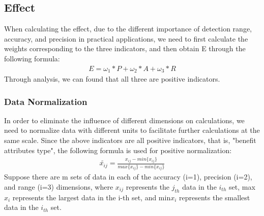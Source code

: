 \documentclass[12pt]{article}  %
\begin{document}
\subsection{Effect}
When calculating the effect, due to the different importance of detection range, accuracy, and precision in practical applications, we need to first calculate the weights corresponding to the three indicators, and then obtain E through the following formula:
\begin{equation}
    \begin{aligned}
E=\omega_1*P+\omega_2*A+\omega_3*R
 \end{aligned}
      \end{equation}
Through analysis, we can found that all three are positive indicators.
\subsubsection{Data Normalization}
\indent In order to eliminate the influence of different dimensions on calculations, we need to normalize data with different units to facilitate further calculations at the same scale.
Since the above indicators are all positive indicators, that is, "benefit attributes type", the following formula is used for positive normalization:
\begin{equation}
    \begin{aligned}
        \widetilde{x_{ij}} =  \frac{x_{ij}-min\{x_{ij}\}}{max\{x_{ij}\}-min\{x_{ij}\}}
     \end{aligned}
    \end{equation}
\indent  Suppose there are m sets of data in each of the accuracy (i=1), precision (i=2), and range (i=3) dimensions, where $x_{ij}$ represents the $j_{th}$ data in the $i_{th}$ set, max{$x_i$} represents the largest data in the i-th set, and min{$x_i$} represents the smallest data in the $i_{th}$ set.
\end{document}
